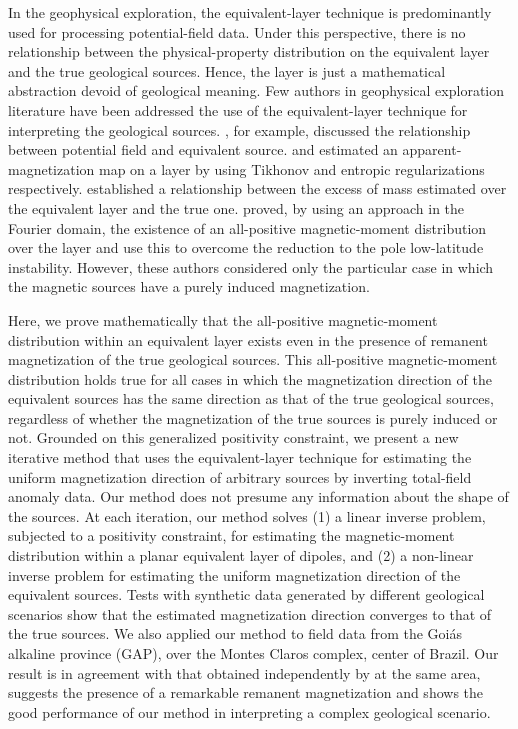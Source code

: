 In the geophysical exploration, the equivalent-layer technique is predominantly used for processing potential-field data. 
Under this perspective, there is no relationship between the physical-property distribution on the equivalent layer 
and the true geological sources. Hence, the layer is just a mathematical abstraction devoid of geological meaning. 
Few authors in geophysical exploration literature have been addressed the use of the equivalent-layer technique for interpreting
the geological sources. \cite{pedersen1991}, for example, discussed the relationship between potential field and equivalent source. 
\cite{medeiros_silva1996} and \cite{silva-etal2010} estimated an apparent-magnetization map on a layer by using Tikhonov and 
entropic regularizations respectively. \cite{siqueira_etal_2017} established a relationship between the excess of mass estimated 
over the equivalent layer and the true one. \cite{li_etal_2014} proved, by using an approach in the Fourier domain, 
the existence of an all-positive magnetic-moment distribution over the layer and use this to overcome the reduction to the pole low-latitude instability. 
However, these authors considered only the particular case in which the magnetic sources have a purely induced magnetization.

Here, we prove mathematically that the all-positive magnetic-moment distribution within an equivalent layer exists even in the 
presence of remanent magnetization of the true geological sources. This all-positive magnetic-moment distribution holds true for 
all cases in which the magnetization direction of the equivalent sources has the same direction as that of the true geological sources, 
regardless of whether the magnetization of the true sources is purely induced or not. Grounded on this generalized positivity constraint, 
we present a new iterative method that uses the equivalent-layer technique for estimating the uniform magnetization direction of 
arbitrary sources by inverting total-field anomaly data. Our method does not presume any information about the shape of the sources. 
At each iteration, our method solves (1) a linear inverse problem, subjected to a positivity constraint, for estimating the magnetic-moment 
distribution within a planar equivalent layer of dipoles, and (2) a non-linear inverse problem for estimating the uniform magnetization 
direction of the equivalent sources. Tests with synthetic data generated by different geological scenarios show that the estimated magnetization
direction converges to that of the true sources. We also applied our method to field data from the Goi{\' a}s alkaline province (GAP), 
over the Montes Claros complex, center of Brazil. Our result is in agreement with that obtained independently by \cite{zhang_etal_2018} 
at the same area, suggests the presence of a remarkable remanent magnetization and shows the good performance of our method in interpreting 
a complex geological scenario.
